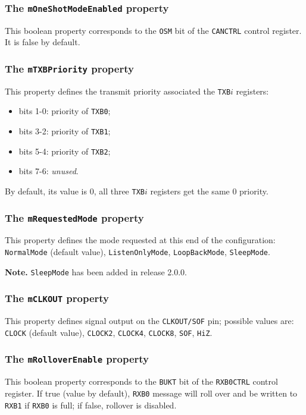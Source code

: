 \documentclass[10pt, a4paper, obeyspaces]{extarticle}
\newcommand \subsubsectionLabel[2]{\subsubsection{#1}\label{subsubsec:#2}}
\begin{document}
\subsubsectionLabel{The \texttt{mOneShotModeEnabled} property}{mOneShotModeEnabled}

This boolean property corresponds to the \texttt{OSM} bit of the \texttt{CANCTRL} control register. It is false by default.



\subsubsectionLabel{The \texttt{mTXBPriority} property}{mTXBPriority}

This property defines the transmit priority associated the \texttt{TXB$i$} registers:
\begin{itemize}
  \item bits 1-0: priority of \texttt{TXB0};
  \item bits 3-2: priority of \texttt{TXB1};
  \item bits 5-4: priority of \texttt{TXB2};
  \item bits 7-6: \emph{unused}.
\end{itemize}

By default, its value is $0$, all three \texttt{TXB$i$} registers get the same $0$ priority.



\subsubsectionLabel{The \texttt{mRequestedMode} property}{mRequestedMode}

This property defines the mode requested at this end of the configuration: \texttt{NormalMode} (default value), \texttt{ListenOnlyMode}, \texttt{LoopBackMode}, \texttt{SleepMode}.

{\bf Note. } \texttt{SleepMode} has been added in release 2.0.0.



\subsubsectionLabel{The \texttt{mCLKOUT} property}{mCLKOUT}

This property defines signal output on the \texttt{CLKOUT/SOF} pin; possible values are: \texttt{CLOCK} (default value), \texttt{CLOCK2}, \texttt{CLOCK4}, \texttt{CLOCK8}, \texttt{SOF}, \texttt{HiZ}.



\subsubsectionLabel{The \texttt{mRolloverEnable} property}{mRolloverEnable}

This boolean property corresponds to the \texttt{BUKT} bit of the \texttt{RXB0CTRL} control register. If true (value by default), \texttt{RXB0} message will roll over and be written to \texttt{RXB1} if \texttt{RXB0} is full; if false, rollover is disabled.
\end{document}
